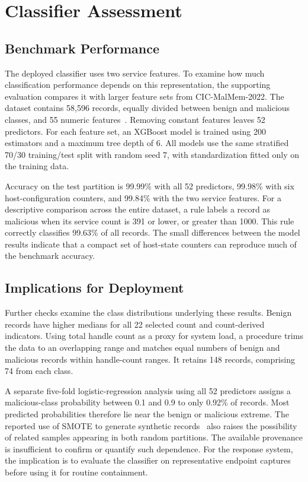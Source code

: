 \documentclass[conference]{IEEEtran}
\begin{document}
\section{Classifier Assessment}
\label{sec:assessment}

\subsection{Benchmark Performance}
The deployed classifier uses two service features. To examine how much
classification performance depends on this representation, the supporting
evaluation compares it with larger feature sets from CIC-MalMem-2022.
The dataset contains 58{,}596 records, equally divided between benign and
malicious classes, and 55 numeric features~\cite{carrier2022,cicmalmem}.
Removing constant features leaves 52 predictors. For each feature set,
an XGBoost model is trained using 200 estimators and a maximum tree depth
of 6. All models use the same stratified 70/30 training/test split with
random seed 7, with standardization fitted only on the training data.

Accuracy on the test partition is 99.99\% with all 52 predictors, 99.98\%
with six host-configuration counters, and 99.84\% with the two service
features. For a descriptive comparison across the entire dataset, a rule
labels a record as malicious when its service count is 391 or lower, or
greater than 1000. This rule correctly classifies 99.63\% of all records.
The small differences between the model results indicate that a compact
set of host-state counters can reproduce much of the benchmark accuracy.

\subsection{Implications for Deployment}
Further checks examine the class distributions underlying these results.
Benign records have higher medians for all 22 selected count and count-derived
indicators. Using total handle count as a proxy for system load, a procedure
trims the data to an overlapping range and matches equal numbers of benign
and malicious records within handle-count ranges. It retains 148 records,
comprising 74 from each class.

A separate five-fold logistic-regression analysis using all 52 predictors
assigns a malicious-class probability between 0.1 and 0.9 to only 0.92\% of
records. Most predicted probabilities therefore lie near the benign or
malicious extreme. 
The reported use of SMOTE to generate synthetic records~\cite{carrier2022} also raises
the possibility of related samples appearing in both random partitions.
The available provenance is insufficient to confirm or quantify such dependence.
For the response system, the implication is to evaluate the classifier on
representative endpoint captures before using it for routine containment.
\end{document}
